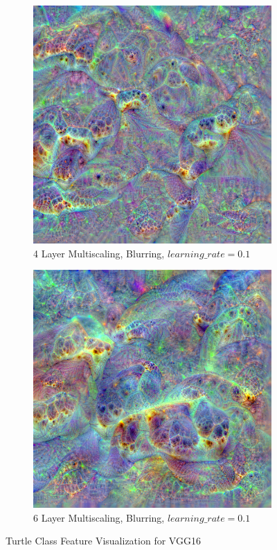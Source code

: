 \begin{figure}
    \captionsetup{justification=centering}

    \begin{subfigure}[t]{0.46\textwidth}
        \captionsetup{justification=centering}
        \centering
        \includegraphics[width=.7\linewidth]{figuras/feat_vis/experiments/classes/cl33/random_image_ci33_lr1e-1_pl4.png}
        \caption{4 Layer Multiscaling, Blurring, \(learning\_rate = 0.1\)}
    \end{subfigure}
    \hfill
    \begin{subfigure}[t]{0.46\textwidth}
        \captionsetup{justification=centering}
        \centering
        \includegraphics[width=.7\linewidth]{figuras/feat_vis/experiments/classes/cl33/random_image_ci33_lr1e-1_pl6.png}
        \caption{6 Layer Multiscaling, Blurring, \(learning\_rate = 0.1\)}
    \end{subfigure}

    \caption{Turtle Class Feature Visualization for VGG16}
    \label{fig:class_turtle}
\end{figure}



